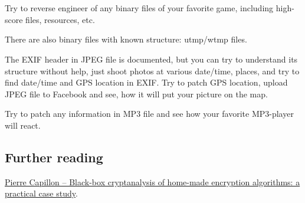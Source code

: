 \chapter{\ESph{}\PTBRph{}\PLph{}\ITAph{}
\NLph{}}


\EN{}
\EN{}\RU{}
\EN{}
\EN{}\RU{}
\EN{}\RU{}

\ifdefined\ENGLISH
\section{\Exercise}

Try to reverse engineer of any binary files of your favorite game, including high-score files, resources, etc.

There are also binary files with known structure: utmp/wtmp files.

The EXIF header in JPEG file is documented, but you can try to understand its structure without help, just shoot photos
at various date/time, places, and try to find date/time and GPS location in EXIF.
Try to patch GPS location, upload JPEG file to Facebook and see, how it will put your picture on the map.

Try to patch any information in MP3 file and see how your favorite MP3-player will react.

\section{Further reading}

\href{https://yurichev.com/mirrors/SSTIC2016-Article-cryptanalyse_en_boite_noire_de_chiffrement_proprietaire-capillon.pdf}{Pierre Capillon -- Black-box cryptanalysis of home-made encryption algorithms: a practical case study}.

\fi %

